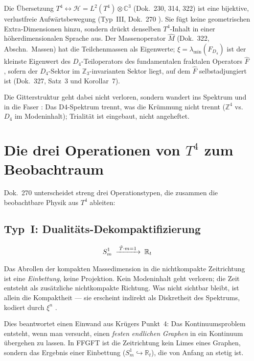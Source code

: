 Die Übersetzung $T^4 \leftrightarrow \mathcal{H} = L^2(T^4) \otimes \mathbb{C}^3$
(Dok.~230, 314, 322) ist eine bijektive, verlustfreie Aufwärtsbewegung
(Typ~III, Dok.~270 \K).
Sie fügt keine geometrischen Extra-Dimensionen hinzu, sondern drückt
denselben $T^4$-Inhalt in einer höherdimensionalen Sprache aus.
Der Massenoperator $\hat{M}$ (Dok.~322, Abschn.\ Massen) hat die
Teilchenmassen als Eigenwerte; $\xi = \lambda_{\min}(\hat{F}_{D_4})$ ist
der kleinste Eigenwert des $D_4$-Teiloperators des fundamentalen
fraktalen Operators $\hat{F}$ \B, sofern der $D_4$-Sektor im
$\mathbb{Z}_3$-invarianten Sektor liegt, auf dem $\hat{F}$
selbstadjungiert ist (Dok.~327, Satz~3 und Korollar~7).

Die Gitterstruktur geht dabei nicht verloren, sondern wandert
ins Spektrum und in die Faser \K:
Das D4-Spektrum trennt, was die Krümmung nicht trennt
($\mathbb{Z}^4$ vs.\ $D_4$ im Modeninhalt);
Trialität ist eingebaut, nicht angeheftet.

\section{Die drei Operationen von $T^4$ zum Beobachtraum}
\label{sec:operationen}

Dok.~270 unterscheidet streng drei Operationstypen, die zusammen
die beobachtbare Physik aus $T^4$ ableiten:

\subsection{Typ~I: Dualitäts-Dekompaktifizierung}

\[
  S^1_m \;\xrightarrow{\;\tilde{T}\cdot m = 1\;}\; \mathbb{R}_t
\]

Das Abrollen der kompakten Massedimension in die nichtkompakte
Zeitrichtung ist eine \emph{Einbettung}, keine Projektion.
Kein Modeninhalt geht verloren; die Zeit entsteht als zusätzliche
nichtkompakte Richtung.
Was nicht sichtbar bleibt, ist allein die Kompaktheit — sie erscheint
indirekt als Diskretheit des Spektrums, kodiert durch $\xi^n$ \K.

Dies beantwortet einen Einwand aus Krügers Punkt~4:
Das Kontinuumsproblem entsteht, wenn man versucht, einen
\emph{festen endlichen Graphen} in ein Kontinuum übergehen zu lassen.
In FFGFT ist die Zeitrichtung kein Limes eines Graphen,
sondern das Ergebnis einer Einbettung ($S^1_m \hookrightarrow \mathbb{R}_t$),
die von Anfang an stetig ist.

